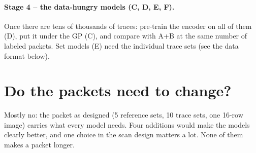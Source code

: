 \paragraph{Stage 4 -- the data-hungry models (C, D, E, F).} Once there are tens of thousands of traces: pre-train the encoder on all of them
(D), put it under the GP (C), and compare with A+B at the same number of labeled packets. Set models (E) need the individual trace sets
(see the data format below).

\section{Do the packets need to change?}
\label{sec:dataneeds}

\begin{basic}
Mostly no: the packet as designed (5 reference sets, 10 trace sets, one 16-row image) carries what every model needs. Four additions
would make the models clearly better, and one choice in the scan design matters a lot. None of them makes a packet longer.
\end{basic}

